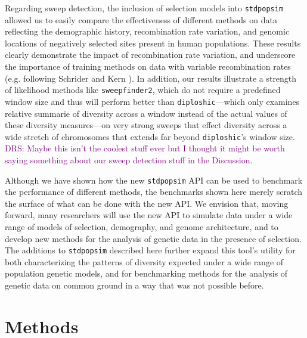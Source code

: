 \documentclass[hidelinks]{article}
\newcommand{\stdpopsim}{\texttt{stdpopsim}\xspace}
\newcommand{\sweepfinder}{\texttt{sweepfinder2}\xspace}
\newcommand{\diploshic}{\texttt{diploshic}\xspace}
\newcommand{\drscomment}[1]{\textcolor{purple}{DRS: #1}}
\begin{document}
    Regarding sweep detection, the inclusion of selection models into \stdpopsim allowed us to easily compare the
    effectiveness of different methods on data reflecting the demographic history, recombination rate variation,
    and genomic locations of negatively selected sites present in human populations. These results clearly demonstrate
    the impact of recombination rate variation, and underscore the importance of training methods on data with variable
    recombination rates (e.g. following Schrider and Kern \citeyear{schrider2017soft}). In addition, our results
    illustrate a strength of likelihood methods like \sweepfinder, which do not require a predefined window size and
    thus will perform better than \diploshic---which only examines relative summarie of diversity across a window instead
    of the actual values of these diversity measures---on very strong sweeps that effect diversity across a wide stretch of
    chromosomes that extends far beyond \diploshic's window size. \drscomment{Maybe this isn't the coolest stuff ever but
    I thought it might be worth saying something about our sweep detection stuff in the Discussion.}

    Although we have shown how the new \stdpopsim API can be used to benchmark the performance of different methods,
    the benchmarks shown here merely scratch the surface of what can be done with the new API.
    We envision that, moving forward, many researchers will use
    the new API to simulate data under a wide range of models of selection, demography, and genome architecture, and to develop
    new methods for the analysis of genetic data in the presence of selection. 
    The additions to \stdpopsim described here further expand this tool's utility for both 
    characterizing the patterns of diversity expected under a wide range of population genetic
    models, and for benchmarking methods for the analysis of genetic data
    on common ground
    in a way that was not possible before.

\section*{Methods}
    \label{methods}
\end{document}
